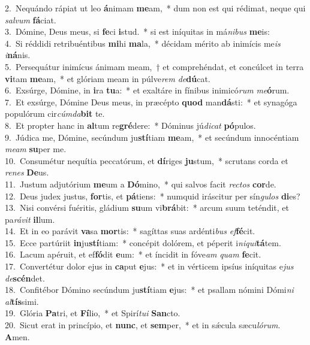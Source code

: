 {2.~}Nequándo rápiat ut leo \textbf{á}nimam \textbf{me}am,~* dum non est qui rédimat, neque qui \textit{sal}\textit{vum} \textbf{fá}ciat.\\
{3.~}Dómine, Deus meus, si \textbf{fe}ci \textbf{i}stud.~* si est iníquitas in má\textit{ni}\textit{bus} \textbf{me}is:\\
{4.~}Si réddidi retribuéntibus \textbf{mi}hi \textbf{ma}la,~* décidam mérito ab inimícis me\textit{is} \textit{i}\textbf{ná}nis.\\
{5.~}Persequátur inimícus ánimam meam,~† et comprehéndat, et concúlcet in terra \textbf{vi}tam \textbf{me}am,~* et glóriam meam in púlve\textit{rem} \textit{de}\textbf{dú}cat.\\
{6.~}Exsúrge, Dómine, in \textbf{i}ra \textbf{tu}a:~* et exaltáre in fínibus inimicó\textit{rum} \textit{me}\textbf{ó}rum.\\
{7.~}Et exsúrge, Dómine Deus meus, in præcépto \textbf{quod} man\textbf{dá}sti:~* et synagóga populórum cir\textit{cúm}\textit{da}\textbf{bit} te.\\
{8.~}Et propter hanc in \textbf{al}tum re\textbf{gré}dere:~* Dóminus jú\textit{di}\textit{cat} \textbf{pó}pulos.\\
{9.~}Júdica me, Dómine, secúndum ju\textbf{stí}tiam \textbf{me}am,~* et secúndum innocéntiam \textit{me}\textit{am} \textbf{su}per me.\\
{10.~}Consumétur nequítia peccatórum, et \textbf{dí}riges \textbf{ju}stum,~* scrutans corda et \textit{re}\textit{nes} \textbf{De}us.\\
{11.~}Justum adjutórium \textbf{me}um a \textbf{Dó}mino,~* qui salvos facit \textit{re}\textit{ctos} \textbf{cor}de.\\
{12.~}Deus judex justus, \textbf{for}tis, et \textbf{pá}tiens:~* numquid iráscitur per sín\textit{gu}\textit{los} \textbf{di}es?\\
{13.~}Nisi convérsi fuéritis, gládium \textbf{su}um vi\textbf{brá}bit:~* arcum suum teténdit, et pa\textit{rá}\textit{vit} \textbf{il}lum.\\
{14.~}Et in eo parávit \textbf{va}sa \textbf{mor}tis:~* sagíttas suas ardénti\textit{bus} \textit{ef}\textbf{fé}cit.\\
{15.~}Ecce partúriit \textbf{in}ju\textbf{stí}tiam:~* concépit dolórem, et péperit i\textit{ni}\textit{qui}\textbf{tá}tem.\\
{16.~}Lacum apéruit, et ef\textbf{fó}dit \textbf{e}um:~* et íncidit in fóve\textit{am} \textit{quam} \textbf{fe}cit.\\
{17.~}Convertétur dolor ejus in \textbf{ca}put \textbf{e}jus:~* et in vérticem ipsíus iníquitas e\textit{jus} \textit{de}\textbf{scén}det.\\
{18.~}Confitébor Dómino secúndum ju\textbf{stí}tiam \textbf{e}jus:~* et psallam nómini Dómi\textit{ni} \textit{al}\textbf{tís}simi.\\
{19.~}Glória \textbf{Pa}tri, et \textbf{Fí}lio,~* et Spirí\textit{tu}\textit{i} \textbf{San}cto.\\
{20.~}Sicut erat in princípio, et \textbf{nunc}, et \textbf{sem}per,~* et in sǽcula sæcu\textit{ló}\textit{rum}. \textbf{A}men.\\
